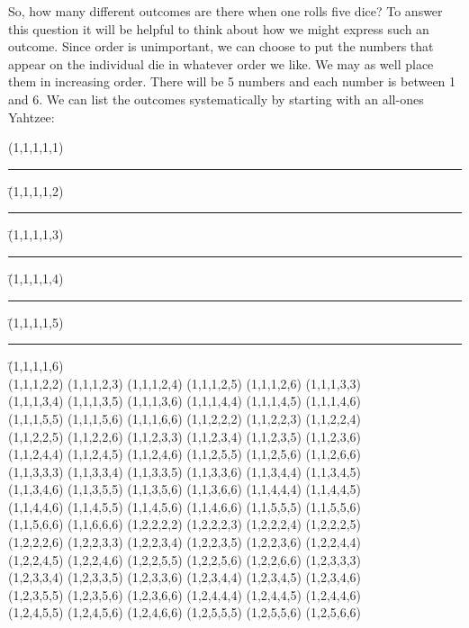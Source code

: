 So, how many different outcomes
are there when one rolls five dice? To answer this question it will
be helpful to think about how we might express such an outcome.  
Since order is unimportant, we can choose to put the numbers that appear
on the individual die in whatever order we like.  We may as well place them
in increasing order.  There will be 5 numbers and each number is between 1
and 6.  We can list the outcomes systematically by starting with an all-ones
Yahtzee:

\begin{tabbing}
(1,1,1,1,1) \rule{8pt}{0pt} \= (1,1,1,1,2) \rule{8pt}{0pt} \= (1,1,1,1,3) \rule{8pt}{0pt} \= (1,1,1,1,4) \rule{8pt}{0pt} \= (1,1,1,1,5) \rule{8pt}{0pt} \= (1,1,1,1,6) \\ 
(1,1,1,2,2) \> (1,1,1,2,3) \> (1,1,1,2,4) \> (1,1,1,2,5) \> (1,1,1,2,6) \> (1,1,1,3,3) \\ 
(1,1,1,3,4) \> (1,1,1,3,5) \> (1,1,1,3,6) \> (1,1,1,4,4) \> (1,1,1,4,5) \> (1,1,1,4,6) \\ 
(1,1,1,5,5) \> (1,1,1,5,6) \> (1,1,1,6,6) \> (1,1,2,2,2) \> (1,1,2,2,3) \> (1,1,2,2,4) \\ 
(1,1,2,2,5) \> (1,1,2,2,6) \> (1,1,2,3,3) \> (1,1,2,3,4) \> (1,1,2,3,5) \> (1,1,2,3,6) \\ 
(1,1,2,4,4) \> (1,1,2,4,5) \> (1,1,2,4,6) \> (1,1,2,5,5) \> (1,1,2,5,6) \> (1,1,2,6,6) \\ 
(1,1,3,3,3) \> (1,1,3,3,4) \> (1,1,3,3,5) \> (1,1,3,3,6) \> (1,1,3,4,4) \> (1,1,3,4,5) \\ 
(1,1,3,4,6) \> (1,1,3,5,5) \> (1,1,3,5,6) \> (1,1,3,6,6) \> (1,1,4,4,4) \> (1,1,4,4,5) \\ 
(1,1,4,4,6) \> (1,1,4,5,5) \> (1,1,4,5,6) \> (1,1,4,6,6) \> (1,1,5,5,5) \> (1,1,5,5,6) \\ 
(1,1,5,6,6) \> (1,1,6,6,6) \> (1,2,2,2,2) \> (1,2,2,2,3) \> (1,2,2,2,4) \> (1,2,2,2,5) \\ 
(1,2,2,2,6) \> (1,2,2,3,3) \> (1,2,2,3,4) \> (1,2,2,3,5) \> (1,2,2,3,6) \> (1,2,2,4,4) \\ 
(1,2,2,4,5) \> (1,2,2,4,6) \> (1,2,2,5,5) \> (1,2,2,5,6) \> (1,2,2,6,6) \> (1,2,3,3,3) \\ 
(1,2,3,3,4) \> (1,2,3,3,5) \> (1,2,3,3,6) \> (1,2,3,4,4) \> (1,2,3,4,5) \> (1,2,3,4,6) \\ 
(1,2,3,5,5) \> (1,2,3,5,6) \> (1,2,3,6,6) \> (1,2,4,4,4) \> (1,2,4,4,5) \> (1,2,4,4,6) \\ 
(1,2,4,5,5) \> (1,2,4,5,6) \> (1,2,4,6,6) \> (1,2,5,5,5) \> (1,2,5,5,6) \> (1,2,5,6,6) \\ 

\end{tabbing}
